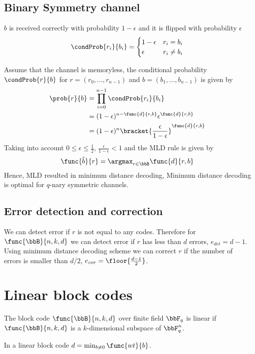 \subsection{Binary Symmetry channel}
\(b\) is received correctly with probability \(1 - \epsilon\) and it is flipped with probability \(\epsilon\)
\begin{equation*}
    \condProb{r_i}{b_i} = \begin{cases}
        1 - \epsilon & r_i = b_i\\
        \epsilon & r_i \neq b_i
    \end{cases}
\end{equation*}

Assume that the channel is memoryless, the conditional probability \(\condProb{r}{b}\) for \(r = (r_0, \dots, r_{n-1})\) and \(b = (b_1, \dots , b_{n-1})\) is given by 
\begin{align*}
    \prob{r}{b} &= \prod_{i = 0}^{n-1} \condProb{r_i}{b_i}\\
    &= (1 - \epsilon)^{n - \func{d}{r,b}} \epsilon^{\func{d}{r,b}}\\
    &= (1 - \epsilon)^n \bracket{\dfrac{\epsilon}{1 - \epsilon}}^{\func{d}{r,b}}
\end{align*}
Taking into account \(0 \leq \epsilon \leq \frac{1}{2}\), \(\frac{\epsilon}{1 - \epsilon} < 1\) and the MLD rule is given by 
\begin{equation*}
    \func{\hat{b}}{r} = \argmax_{r \in \bbB} \func{d}{r,b}
\end{equation*}
Hence, MLD resulted in minimum distance decoding, Minimum distance decoding is optimal for \(q\)-nary symmetric channels. 
\subsection{Error detection and correction}
We can detect error if \(r\) is not equal to any codes. Therefore for \(\func{\bbB}{n,k,d}\) we can detect error if \(r\) has less than \(d\) errors, \(e_{det} = d-1\). Using minimum distance decoding scheme we can correct \(r\) if the number of errors is smaller than \(d/2\), \(e_{cor} = \floor{\frac{d - 1}{2}}\).
\section{Linear block codes}
The block code \(\func{\bbB}{n,k,d}\) over finite field \(\bbF_q\) is linear if \(\func{\bbB}{n,k,d}\) is a \(k\)-dimensional subspace of \(\bbF_q^n\).
\begin{proposition}
    In a linear block code \(d = \min_{b \neq 0} \func{wt}{b}\).
\end{proposition}
